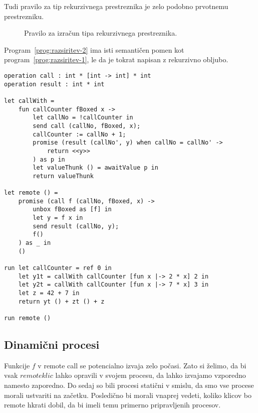 Tudi pravilo za tip rekurzivnega prestreznika je zelo podobno prvotnemu prestrezniku.

\begin{figure}[h]
	\centering
	\small
	\begin{mathpar}
	\end{mathpar}
	
	\caption{Pravilo za izračun tipa rekurzivnega prestreznika.}
	\label{fig:tipi-pravila-rekurzivni-prestreznik}
\end{figure} 

Program~\ref{prog:razsiritev-2} ima isti semantičen pomen kot program~\ref{prog:razsiritev-1}, le da je tokrat napisan z rekurzivno obljubo.

\begin{lstlisting}[caption={Primer z rekurzivnim prestreznikom},label={prog:razsiritev-2},float,floatplacement=h]
operation call : int * [int -> int] * int
operation result : int * int

let callWith =
	fun callCounter fBoxed x ->
		let callNo = !callCounter in
		send call (callNo, fBoxed, x);
		callCounter := callNo + 1;
		promise (result (callNo', y) when callNo = callNo' ->
			return <<y>>
		) as p in
		let valueThunk () = awaitValue p in
		return valueThunk

let remote () =
	promise (call f (callNo, fBoxed, x) ->
		unbox fBoxed as [f] in
		let y = f x in
		send result (callNo, y);
		f()
	) as _ in
	()

run	let callCounter = ref 0 in
	let y1t = callWith callCounter [fun x |-> 2 * x] 2 in
	let y2t = callWith callCounter [fun x |-> 7 * x] 3 in
	let z = 42 + 7 in
	return yt () + zt () + z

run remote ()
\end{lstlisting}


\subsection{Dinamični procesi}

Funkcije $f$ v remote call se potencialno izvaja zelo počasi. Zato si želimo, da bi vsak $remote klic$ lahko opravili v svojem procesu, da lahko izvajamo vzporedno namesto zaporedno. 
Do sedaj so bili procesi statični v smislu, da smo vse procese morali ustvariti na začetku.
Posledično bi morali vnaprej vedeti, koliko klicov bo remote hkrati dobil, da bi imeli temu primerno pripravljenih procesov.

